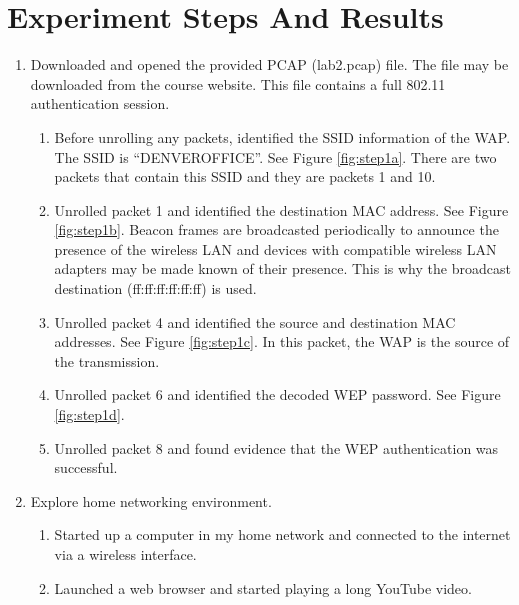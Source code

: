 \documentclass{article}
\begin{document}

\section{Experiment Steps And Results}

\begin{enumerate}
\item \label{step1} Downloaded and opened the provided PCAP (lab2.pcap) file. The file may be
                    downloaded from the course website. This file contains a full 802.11 authentication
                    session.
    \begin{enumerate}
        \item \label{1a} Before unrolling any packets, identified the SSID information of the WAP. The
              SSID is ``DENVEROFFICE''. See Figure \ref{fig:step1a}. There are two packets that contain
              this SSID and they are packets 1 and 10. 
        \item \label{1b} Unrolled packet 1 and identified the destination MAC address. See Figure
               \ref{fig:step1b}. Beacon frames are broadcasted periodically to announce the presence of
               the wireless LAN and devices with compatible wireless LAN adapters may be made known of
               their presence.  This is why the broadcast destination (ff:ff:ff:ff:ff:ff) is used.
        \item \label{1c} Unrolled packet 4 and identified the source and destination MAC addresses.
               See Figure \ref{fig:step1c}. In this packet, the WAP is the source of the transmission.
        \item \label{1d} Unrolled packet 6 and identified the decoded WEP password. See Figure
              \ref{fig:step1d}.
        \item \label{1e} Unrolled packet 8 and found evidence that the WEP authentication was successful.
    \end{enumerate}
\item \label{step2} Explore home networking environment.
    \begin{enumerate}
        \item \label{2a} Started up a computer in my home network and connected to the internet via a wireless
              interface.
        \item \label{2b} Launched a web browser and started playing a long YouTube video.

\end{enumerate}
\end{enumerate}
\end{document}
